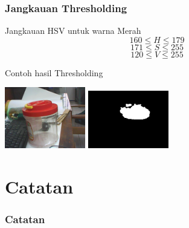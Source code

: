 \documentclass[table,dvipsnames]{beamer}
\begin{document}
\begin{frame}
\frametitle{Jangkauan Thresholding}

\begin{block}{Jangkauan HSV untuk warna Merah}
\begin{equation}
160 \leq H\leq 179
\end{equation}
\begin{equation}
171 \leq S\leq 255
\end{equation}
\begin{equation}
120 \leq V\leq 255
\end{equation}
\end{block}

\begin{block}{Contoh hasil Thresholding}
\begin{center}
 \includegraphics[width=100pt]{./progress/imgori}
 \includegraphics[width=100pt]{./progress/imgthresh}
\end{center}
\end{block}
\end{frame}

\section{Catatan}

\begin{frame}
\frametitle{Catatan}
\end{frame}
\end{document}
